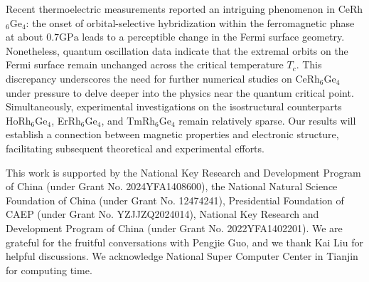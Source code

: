 \documentclass[preprint,12pt]{elsarticle}
\begin{document}

	Recent thermoelectric measurements reported an intriguing phenomenon in CeRh$_6$Ge$_4$: the onset of orbital-selective hybridization within the ferromagnetic phase at about $0.7 \mathrm{GPa}$ leads to a perceptible change in the Fermi surface geometry. Nonetheless, quantum oscillation data indicate that the extremal orbits on the Fermi surface remain unchanged across the critical temperature $T_c$. This discrepancy underscores the need for further numerical studies on CeRh$_6$Ge$_4$ under pressure to delve deeper into the physics near the quantum critical point. Simultaneously, experimental investigations on the isostructural counterparts HoRh$_6$Ge$_4$, ErRh$_6$Ge$_4$, and TmRh$_6$Ge$_4$ remain relatively sparse. Our results will establish a connection between magnetic properties and electronic structure, facilitating subsequent theoretical and experimental efforts.


This work is supported by the  National Key Research and Development Program of China (under Grant No. 2024YFA1408600), the National Natural Science Foundation of China (under Grant No. 12474241), Presidential Foundation of CAEP (under Grant No. YZJJZQ2024014), National Key Research and Development Program of China (under Grant No. 2022YFA1402201).  We are grateful for the fruitful conversations with Pengjie Guo, and we thank Kai Liu for helpful discussions. We acknowledge National Super Computer Center in Tianjin for computing time.

%
 

\end{document}
